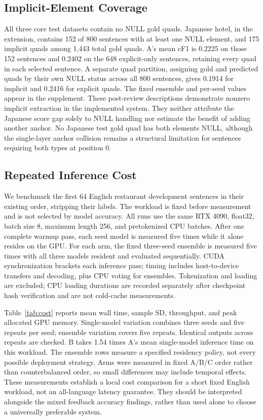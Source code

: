 \documentclass[conference]{IEEEtran}
\begin{document}
\subsection{Implicit-Element Coverage}
All three core test datasets contain no NULL gold quads. Japanese hotel, in the extension, contains 152 of 800 sentences with at least one NULL element, and 175 implicit quads among 1,443 total gold quads. A's mean cF1 is 0.2225 on those 152 sentences and 0.2402 on the 648 explicit-only sentences, retaining every quad in each selected sentence. A separate quad partition, assigning gold and predicted quads by their own NULL status across all 800 sentences, gives 0.1914 for implicit and 0.2416 for explicit quads. The fixed ensemble and per-seed values appear in the supplement. These post-review descriptions demonstrate nonzero implicit extraction in the implemented system. They neither attribute the Japanese score gap solely to NULL handling nor estimate the benefit of adding another anchor. No Japanese test gold quad has both elements NULL, although the single-layer anchor collision remains a structural limitation for sentences requiring both types at position 0.

\subsection{Repeated Inference Cost}

We benchmark the first 64 English restaurant development sentences in their existing order, stripping their labels. The workload is fixed before measurement and is not selected by model accuracy. All runs use the same RTX 4090, float32, batch size 8, maximum length 256, and pretokenized CPU batches. After one complete warmup pass, each seed model is measured five times while it alone resides on the GPU. For each arm, the fixed three-seed ensemble is measured five times with all three models resident and evaluated sequentially. CUDA synchronization brackets each inference pass; timing includes host-to-device transfers and decoding, plus CPU voting for ensembles. Tokenization and loading are excluded; CPU loading durations are recorded separately after checkpoint hash verification and are not cold-cache measurements.

Table~\ref{tab:cost} reports mean wall time, sample SD, throughput, and peak allocated GPU memory. Single-model variation combines three seeds and five repeats per seed; ensemble variation covers five repeats. Identical outputs across repeats are checked. B takes 1.54 times A's mean single-model inference time on this workload. The ensemble rows measure a specified residency policy, not every possible deployment strategy. Arms were measured in fixed A/B/C order rather than counterbalanced order, so small differences may include temporal effects. These measurements establish a local cost comparison for a short fixed English workload, not an all-language latency guarantee. They should be interpreted alongside the mixed feedback accuracy findings, rather than used alone to choose a universally preferable system.
\end{document}
